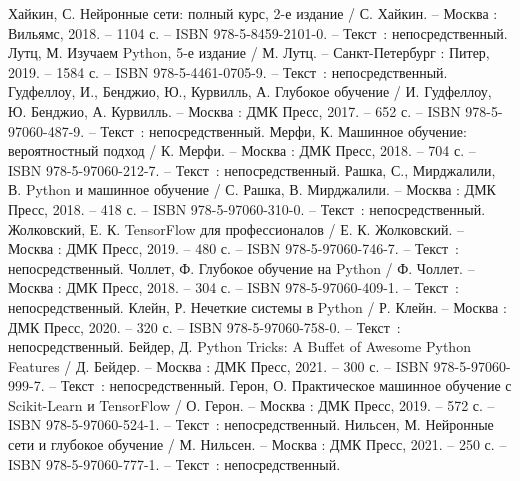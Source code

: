 
\begin{thebibliography}{11}

     Хайкин, С. Нейронные сети: полный курс, 2-е издание / С. Хайкин. – Москва : Вильямс, 2018. – 1104 с. – ISBN 978-5-8459-2101-0. – Текст~: непосредственный.
     Лутц, М. Изучаем Python, 5-е издание / М. Лутц. – Санкт-Петербург : Питер, 2019. – 1584 с. – ISBN 978-5-4461-0705-9. – Текст~: непосредственный.
     Гудфеллоу, И., Бенджио, Ю., Курвилль, А. Глубокое обучение / И. Гудфеллоу, Ю. Бенджио, А. Курвилль. – Москва : ДМК Пресс, 2017. – 652 с. – ISBN 978-5-97060-487-9. – Текст~: непосредственный.
     Мерфи, К. Машинное обучение: вероятностный подход / К. Мерфи. – Москва : ДМК Пресс, 2018. – 704 с. – ISBN 978-5-97060-212-7. – Текст~: непосредственный.
     Рашка, С., Мирджалили, В. Python и машинное обучение / С. Рашка, В. Мирджалили. – Москва : ДМК Пресс, 2018. – 418 с. – ISBN 978-5-97060-310-0. – Текст~: непосредственный.
     Жолковский, Е. К. TensorFlow для профессионалов / Е. К. Жолковский. – Москва : ДМК Пресс, 2019. – 480 с. – ISBN 978-5-97060-746-7. – Текст~: непосредственный.
     Чоллет, Ф. Глубокое обучение на Python / Ф. Чоллет. – Москва : ДМК Пресс, 2018. – 304 с. – ISBN 978-5-97060-409-1. – Текст~: непосредственный.
     Клейн, Р. Нечеткие системы в Python / Р. Клейн. – Москва : ДМК Пресс, 2020. – 320 с. – ISBN 978-5-97060-758-0. – Текст~: непосредственный.
     Бейдер, Д. Python Tricks: A Buffet of Awesome Python Features / Д. Бейдер. – Москва : ДМК Пресс, 2021. – 300 с. – ISBN 978-5-97060-999-7. – Текст~: непосредственный.
     Герон, О. Практическое машинное обучение с Scikit-Learn и TensorFlow / О. Герон. – Москва : ДМК Пресс, 2019. – 572 с. – ISBN 978-5-97060-524-1. – Текст~: непосредственный.
     Нильсен, М. Нейронные сети и глубокое обучение / М. Нильсен. – Москва : ДМК Пресс, 2021. – 250 с. – ISBN 978-5-97060-777-1. – Текст~: непосредственный.
\end{thebibliography}

